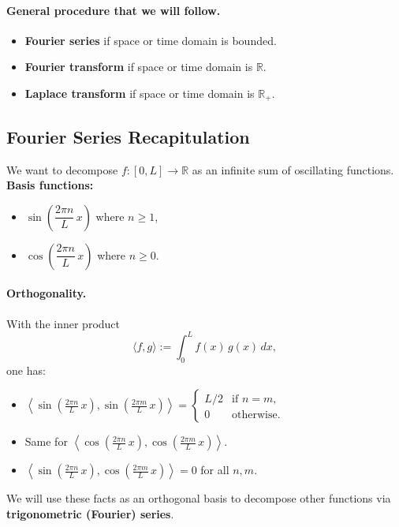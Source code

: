 \paragraph{General procedure that we will follow.}
\begin{itemize}
\item \textbf{Fourier series} if space or time domain is bounded.
\item \textbf{Fourier transform} if space or time domain is $\mathbb{R}$.
\item \textbf{Laplace transform} if space or time domain is $\mathbb{R}_+$.
\end{itemize}

\subsection{Fourier Series Recapitulation}

We want to decompose $f : [0, L] \to \mathbb{R}$ as an infinite sum of oscillating functions. \textbf{Basis functions:}
\begin{itemize}
\item $\sin\!\left(\dfrac{2\pi n}{L}\,x\right)$ where $n \geq 1$,
\item $\cos\!\left(\dfrac{2\pi n}{L}\,x\right)$ where $n \geq 0$.
\end{itemize}

\paragraph{Orthogonality.} With the inner product
\[
\langle f, g \rangle := \int_0^L f(x)\,g(x)\,dx,
\]
one has:
\begin{itemize}
\item $\left\langle \sin\!\left(\tfrac{2\pi n}{L}\,x\right), \sin\!\left(\tfrac{2\pi m}{L}\,x\right) \right\rangle =
\begin{cases}
L/2 & \text{if } n = m, \\
0 & \text{otherwise.}
\end{cases}$
\item Same for $\left\langle \cos\!\left(\tfrac{2\pi n}{L}\,x\right), \cos\!\left(\tfrac{2\pi m}{L}\,x\right) \right\rangle$.
\item $\left\langle \sin\!\left(\tfrac{2\pi n}{L}\,x\right), \cos\!\left(\tfrac{2\pi m}{L}\,x\right) \right\rangle = 0$ for all $n, m$.
\end{itemize}

We will use these facts as an orthogonal basis to decompose other functions via \textbf{trigonometric (Fourier) series}.

